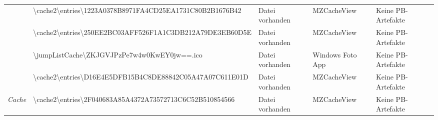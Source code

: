 \begin{appendices}
{\begin{landscape}
\begin{table}[h!]
{\begin{tabular}{cllll}
	\multicolumn{1}{|c|}{}                                                                                       & \multicolumn{1}{l|}{\cellcolor[HTML]{34CDF9}\textbackslash{}cache2\textbackslash{}entries\textbackslash{}1223A0378B8971FA4CD25EA1731C80B2B1676B42}                                                                  & \multicolumn{1}{l|}{\cellcolor[HTML]{009901}Datei vorhanden}                                      & \multicolumn{1}{l|}{MZCacheView}            & \multicolumn{1}{l|}{\cellcolor[HTML]{F8A102}Keine PB-Artefakte} \\ \cline{2-5} 
	\multicolumn{1}{|c|}{}                                                                                       & \multicolumn{1}{l|}{\cellcolor[HTML]{34CDF9}\textbackslash{}cache2\textbackslash{}entries\textbackslash{}250EE2BC03AFF526F1A1C3DB212A79DE3EB60D5E}                                                                  & \multicolumn{1}{l|}{\cellcolor[HTML]{009901}Datei vorhanden}                                      & \multicolumn{1}{l|}{MZCacheView}            & \multicolumn{1}{l|}{\cellcolor[HTML]{F8A102}Keine PB-Artefakte} \\ \cline{2-5} 
	\multicolumn{1}{|c|}{}                                                                                       & \multicolumn{1}{l|}{\cellcolor[HTML]{34CDF9}\textbackslash{}jumpListCache\textbackslash{}ZKJGVJPzPe7w4w0KwEY0jw==.ico}                                                                                              & \multicolumn{1}{l|}{\cellcolor[HTML]{009901}Datei vorhanden}                                      & \multicolumn{1}{l|}{Windows Foto App}            & \multicolumn{1}{l|}{\cellcolor[HTML]{F8A102}Keine PB-Artefakte} \\ \cline{2-5} 
	\multicolumn{1}{|c|}{}                                                                                       & \multicolumn{1}{l|}{\cellcolor[HTML]{34CDF9}\textbackslash{}cache2\textbackslash{}entries\textbackslash{}D16E4E5DFB15B4C8DE88842C05A47A07C611E01D}                                                                  & \multicolumn{1}{l|}{\cellcolor[HTML]{009901}Datei vorhanden}                                      & \multicolumn{1}{l|}{MZCacheView}            & \multicolumn{1}{l|}{\cellcolor[HTML]{F8A102}Keine PB-Artefakte} \\ \cline{2-5} 
	\multicolumn{1}{|c|}{\multirow{-6}{*}{\textit{Cache}}}                                                       & \multicolumn{1}{l|}{\cellcolor[HTML]{34CDF9}\textbackslash{}cache2\textbackslash{}entries\textbackslash{}2F040683A85A4372A73572713C6C52B510854566}                                                                  & \multicolumn{1}{l|}{\cellcolor[HTML]{009901}Datei vorhanden}                                      & \multicolumn{1}{l|}{MZCacheView}            & \multicolumn{1}{l|}{\cellcolor[HTML]{F8A102}Keine PB-Artefakte} \\ \hline

\end{tabular}}
\end{table}
\end{landscape}}
\end{appendices}

